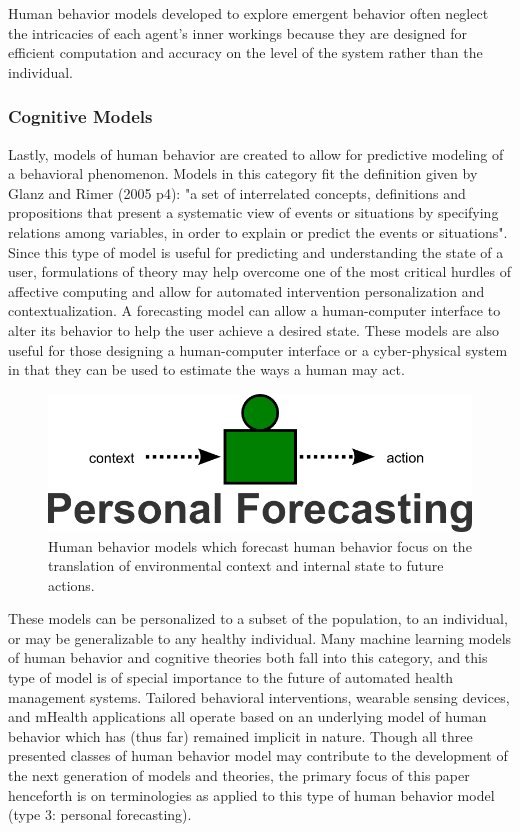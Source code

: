 Human behavior models developed to explore emergent behavior often neglect the intricacies of each agent’s inner workings because they are designed for efficient computation and accuracy on the level of the system rather than the individual. 

\subsubsection{Cognitive Models}
Lastly, models of human behavior are created to allow for predictive modeling of a behavioral phenomenon.
Models in this category fit the definition given by Glanz and Rimer (2005 p4): "a set of interrelated concepts, definitions and propositions that present a systematic view of events or situations by specifying relations among variables, in order to explain or predict the events or situations".
Since this type of model is useful for predicting and understanding the state of a user, formulations of theory may help overcome one of the most critical hurdles of affective computing and allow for automated intervention personalization and contextualization. 
A forecasting model can allow a human-computer interface to alter its behavior to help the user achieve a desired state. 
These models are also useful for those designing a human-computer interface or a cyber-physical system in that they can be used to estimate the ways a human may act. 

\begin{figure}[!t]
  \centering
  \includegraphics[width=0.5\columnwidth]{img/cognitiveHBM}
  \caption{Human behavior models which forecast human behavior focus on the translation of environmental context and internal state to future actions.}
  \label{cognitiveHBM}
\end{figure}

These models can be personalized to a subset of the population, to an individual, or may be generalizable to any healthy individual. 
Many machine learning models of human behavior and cognitive theories both fall into this category, and this type of model is of special importance to the future of automated health management systems. 
Tailored behavioral interventions, wearable sensing devices, and mHealth applications all operate based on an underlying model of human behavior which has (thus far) remained implicit in nature. 
Though all three presented classes of human behavior model may contribute to the development of the next generation of models and theories, the primary focus of this paper henceforth is on terminologies as applied to this type of human behavior model (type 3: personal forecasting).

